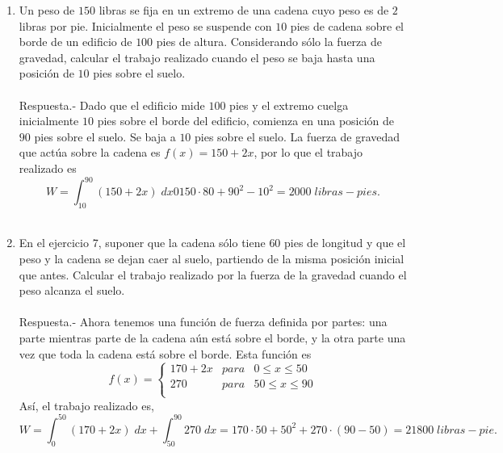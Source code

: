 \begin{enumerate}[ \bfseries 1.]
    \item Un peso de $150$ libras se fija en un extremo de una cadena cuyo peso es de $2$ libras por pie. Inicialmente el peso se suspende con $10$ pies de cadena sobre el borde de un edificio de $100$ pies de altura. Considerando sólo la fuerza de gravedad, calcular el trabajo realizado cuando el peso se baja hasta una posición de $10$ pies sobre el suelo.\\\\
	Respuesta.-\; Dado que el edificio mide $100$ pies y el extremo cuelga inicialmente $10$ pies sobre el borde del edificio, comienza en una posición de $90$ pies sobre el suelo. Se baja a $10$ pies sobre el suelo. La fuerza de gravedad que actúa sobre la cadena es $f(x)=150+2x$, por lo que el trabajo realizado es 
	$$W = \int_{10}^{90}(150+2x)\; dx 0 150\cdot 80 + 90^2 - 10^2 = 2000 \; libras-pies.$$\\

    \item En el ejercicio 7, suponer que la cadena sólo tiene $60$ pies de longitud y que el peso y la cadena se dejan caer al suelo, partiendo de la misma posición inicial que antes. Calcular el trabajo realizado por la fuerza de la gravedad cuando el peso alcanza el suelo.\\\\
	Respuesta.-\; Ahora tenemos una función de fuerza definida por partes: una parte mientras parte de la cadena aún está sobre el borde, y la otra parte una vez que toda la cadena está sobre el borde. Esta función es
	$$f(x)=\left\{\begin{array}{rcl}
		170+2x & para & 0\leq x\leq 50\\
		270 & para & 50\leq x\leq 90\\
	\end{array}\right.$$
	Así, el trabajo realizado es,
	$$W = \int_0^{50}(170+2x)\; dx + \int_{50}^{90} 270\; dx = 170\cdot 50 + 50^2 + 270\cdot(90-50) = 21800\; libras-pie.$$\\


\end{enumerate}
